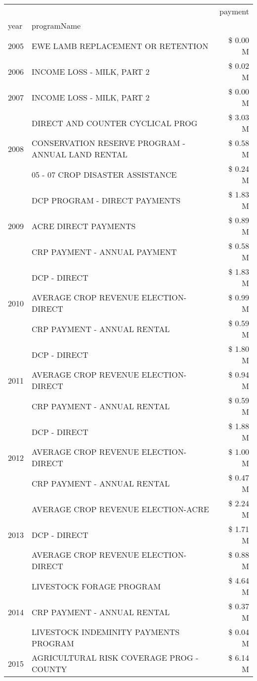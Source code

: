 \begin{tabular}{llr}
\toprule
 &  & payment \\
year & programName &  \\
\midrule
2005 & EWE LAMB REPLACEMENT OR RETENTION & \$ 0.00 M \\
\cline{1-3}
2006 & INCOME LOSS - MILK, PART 2 & \$ 0.02 M \\
\cline{1-3}
2007 & INCOME LOSS - MILK, PART 2 & \$ 0.00 M \\
\cline{1-3}
\multirow[t]{3}{*}{2008} & DIRECT AND COUNTER CYCLICAL PROG & \$ 3.03 M \\
 & CONSERVATION RESERVE PROGRAM - ANNUAL LAND RENTAL & \$ 0.58 M \\
 & 05 - 07 CROP DISASTER ASSISTANCE & \$ 0.24 M \\
\cline{1-3}
\multirow[t]{3}{*}{2009} & DCP PROGRAM - DIRECT PAYMENTS & \$ 1.83 M \\
 & ACRE DIRECT PAYMENTS & \$ 0.89 M \\
 & CRP PAYMENT - ANNUAL PAYMENT & \$ 0.58 M \\
\cline{1-3}
\multirow[t]{3}{*}{2010} & DCP - DIRECT & \$ 1.83 M \\
 & AVERAGE CROP REVENUE ELECTION-DIRECT & \$ 0.99 M \\
 & CRP PAYMENT - ANNUAL RENTAL & \$ 0.59 M \\
\cline{1-3}
\multirow[t]{3}{*}{2011} & DCP - DIRECT & \$ 1.80 M \\
 & AVERAGE CROP REVENUE ELECTION-DIRECT & \$ 0.94 M \\
 & CRP PAYMENT - ANNUAL RENTAL & \$ 0.59 M \\
\cline{1-3}
\multirow[t]{3}{*}{2012} & DCP - DIRECT & \$ 1.88 M \\
 & AVERAGE CROP REVENUE ELECTION-DIRECT & \$ 1.00 M \\
 & CRP PAYMENT - ANNUAL RENTAL & \$ 0.47 M \\
\cline{1-3}
\multirow[t]{3}{*}{2013} & AVERAGE CROP REVENUE ELECTION-ACRE & \$ 2.24 M \\
 & DCP - DIRECT & \$ 1.71 M \\
 & AVERAGE CROP REVENUE ELECTION-DIRECT & \$ 0.88 M \\
\cline{1-3}
\multirow[t]{3}{*}{2014} & LIVESTOCK FORAGE PROGRAM & \$ 4.64 M \\
 & CRP PAYMENT - ANNUAL RENTAL & \$ 0.37 M \\
 & LIVESTOCK INDEMINITY PAYMENTS PROGRAM & \$ 0.04 M \\
\cline{1-3}
\multirow[t]{3}{*}{2015} & AGRICULTURAL RISK COVERAGE PROG - COUNTY & \$ 6.14 M \\

\end{tabular}
